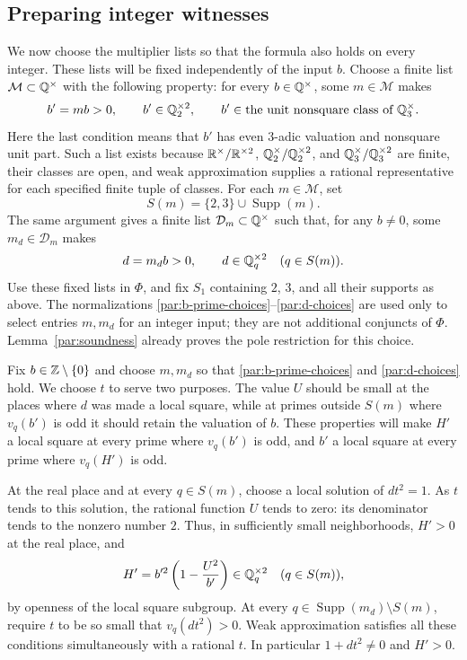 \subsection{Preparing integer witnesses}

We now choose the multiplier lists so that the formula also holds on
every integer. These lists will be fixed independently of the input
$b$. Choose a finite list $\mathcal M\subset\mathbb Q^\times$ with the
following property: for every $b\in\mathbb Q^\times$, some $m\in\mathcal M$
makes
\begin{equation}\label{par:b-prime-choices}
 b'=mb>0,\qquad b'\in\mathbb Q_2^{\times2},\qquad
 b'\in\text{the unit nonsquare class of }\mathbb Q_3^\times.
\end{equation}
Here the last condition means that $b'$ has even $3$-adic valuation
and nonsquare unit part. Such a list exists because
$\mathbb R^\times/\mathbb R^{\times2}$, $\mathbb Q_2^\times/\mathbb Q_2^{\times2}$, and
$\mathbb Q_3^\times/\mathbb Q_3^{\times2}$ are finite, their classes are open,
and weak approximation supplies a rational representative for each
specified finite tuple of classes. For each $m\in\mathcal M$, set
\[
 S(m)=\{2,3\}\cup\operatorname{Supp}(m).
\]
The same argument gives a finite list
$\mathcal D_m\subset\mathbb Q^\times$ such that, for any $b\ne0$, some
$m_d\in\mathcal D_m$ makes
\begin{equation}\label{par:d-choices}
 d=m_db>0,\qquad d\in\mathbb Q_q^{\times2}\quad(q\in S(m)).
\end{equation}
Use these fixed lists in $\Phi$, and fix $S_1$ containing $2$, $3$,
and all their supports as above. The normalizations
\eqref{par:b-prime-choices}--\eqref{par:d-choices} are used only to
select entries $m,m_d$ for an integer input; they are not additional
conjuncts of $\Phi$. Lemma~\ref{par:soundness} already proves the pole
restriction for this choice.

Fix $b\in\mathbb Z\setminus\{0\}$ and choose $m,m_d$ so that
\eqref{par:b-prime-choices} and \eqref{par:d-choices} hold.
We choose $t$ to serve two purposes. The value $U$ should be small at
the places where $d$ was made a local square, while at primes outside
$S(m)$ where $v_q(b')$ is odd it should retain the valuation of $b$.
These properties will make $H'$ a local square at every prime where
$v_q(b')$ is odd, and $b'$ a local square at every prime where
$v_q(H')$ is odd.

At the real place and at every $q\in S(m)$, choose a local solution
of $dt^2=1$. As $t$ tends to this solution, the rational function
$U$ tends to zero: its denominator tends to the nonzero number $2$.
Thus, in sufficiently small neighborhoods, $H'>0$ at the real place,
and
\[
 H'=b'^2\left(1-\frac{U^2}{b'}\right)\in\mathbb Q_q^{\times2}
 \quad(q\in S(m)),
\]
by openness of the local square subgroup. At every
$q\in\operatorname{Supp}(m_d)\setminus S(m)$, require $t$ to be
so small that $v_q(dt^2)>0$. Weak approximation satisfies all these
conditions simultaneously with a rational $t$. In particular
$1+dt^2\ne0$ and $H'>0$.

